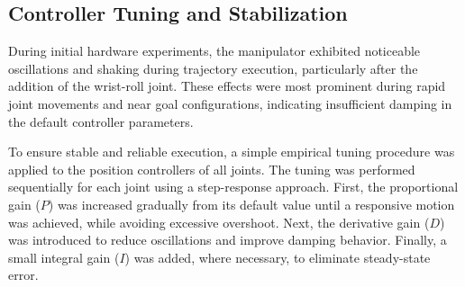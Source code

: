\documentclass[conference]{IEEEtran}
\begin{document}
%		
%	
%	
%	
	\subsection{Controller Tuning and Stabilization}
	
	During initial hardware experiments, the manipulator exhibited noticeable oscillations and shaking during trajectory execution, particularly after the addition of the wrist-roll joint. These effects were most prominent during rapid joint movements and near goal configurations, indicating insufficient damping in the default controller parameters.
	
	To ensure stable and reliable execution, a simple empirical tuning procedure was applied to the position controllers of all joints. The tuning was performed sequentially for each joint using a step-response approach. First, the proportional gain ($P$) was increased gradually from its default value until a responsive motion was achieved, while avoiding excessive overshoot. Next, the derivative gain ($D$) was introduced to reduce oscillations and improve damping behavior. Finally, a small integral gain ($I$) was added, where necessary, to eliminate steady-state error.
	
\end{document}
